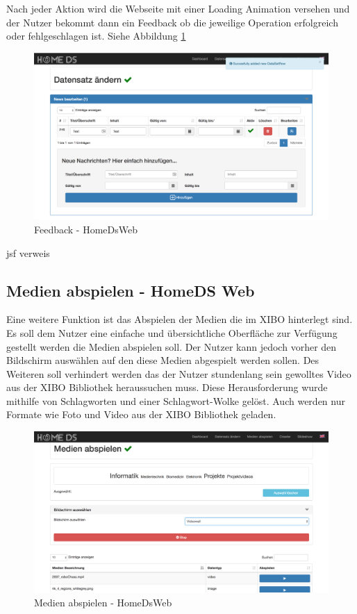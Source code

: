 Nach jeder Aktion wird die Webseite mit einer Loading Animation versehen und der Nutzer bekommt dann ein Feedback ob die jeweilige Operation erfolgreich oder fehlgeschlagen ist. Siehe Abbildung \ref{img:feedback}

\begin{figure}[H]
\centering
\includegraphics[width=1\textwidth]{images/08_HomeDsWeb/Message.png}
\caption{Feedback - HomeDsWeb}
\label{img:feedback}
\end{figure}


\pageref{sec:javaeejsf} jsf verweis


\subsection{Medien abspielen - HomeDS Web}\label{sec:playmedia}
Eine weitere Funktion ist das Abspielen der Medien die im XIBO hinterlegt sind. Es soll dem Nutzer eine einfache und übersichtliche Oberfläche zur Verfügung gestellt werden die Medien abspielen soll. Der Nutzer kann jedoch vorher den Bildschirm auswählen auf den diese Medien abgespielt werden sollen. Des Weiteren soll verhindert werden das der Nutzer stundenlang sein gewolltes Video aus der XIBO Bibliothek heraussuchen muss. Diese Herausforderung wurde mithilfe von Schlagworten und einer Schlagwort-Wolke gelöst. Auch werden nur Formate wie Foto und Video aus der XIBO Bibliothek geladen.

\begin{figure}[H]
\centering
\includegraphics[width=1\textwidth]{images/08_HomeDsWeb/PlayMediaOverview.png}
\caption{Medien abspielen - HomeDsWeb}
\label{img:playmedia}
\end{figure}

